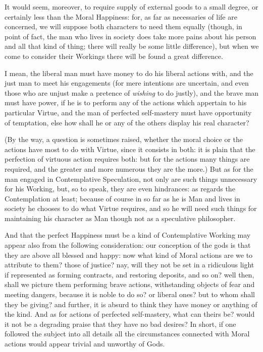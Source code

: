 It would seem, moreover, to require supply of external goods to a small degree,
or certainly less than the Moral Happiness: for, as far as necessaries of life
are concerned, we will suppose both characters to need them equally (though, in
point of fact, the man who lives in society does take more pains about his
person and all that kind of thing; there will really be some little
difference), but when we come to consider their Workings there will be found a
great difference.

I mean, the liberal man must have money to do his liberal actions with, and the
just man to meet his engagements (for mere intentions are uncertain, and even
those who are unjust make a pretence of \emph{wishing} to do justly), and the
brave man must have power, if he is to perform any of the actions which
appertain to his particular Virtue, and the man of perfected self-mastery must
have opportunity of temptation, else how shall he or any of the others display
his real character?

(By the way, a question is sometimes raised, whether the moral choice or the
actions have most to do with Virtue, since it consists in both: it is plain
that the perfection of virtuous action requires both: but for the actions many
things are required, and the greater and more numerous they are the more.) But
as for the man engaged in Contemplative Speculation, not only are such things
unnecessary for his Working, but, so to speak, they are even hindrances: as
regards the Contemplation at least; because of course in so far as he is Man
and lives in society he chooses to do what Virtue requires, and so he will need
such things for maintaining his character as Man though not as a speculative
philosopher.

And that the perfect Happiness must be a kind of Contemplative Working may
appear also from the following consideration: our conception of the gods is
that they are above all blessed and happy: now what kind of Moral actions are
we to attribute to them? those of justice? nay, will they not be set in a
ridiculous light if represented as forming contracts, and restoring deposits,
and so on? well then, shall we picture them performing brave actions,
withstanding objects of fear and meeting dangers, because it is noble to do so?
or liberal ones? but to whom shall they be giving? and further, it is absurd to
think they have money or anything of the kind. And as for actions of perfected
self-mastery, what can theirs be? would it not be a degrading praise that they
have no bad desires? In short, if one followed the subject into all details all
the circumstances connected with Moral actions would appear trivial and
unworthy of Gods.

